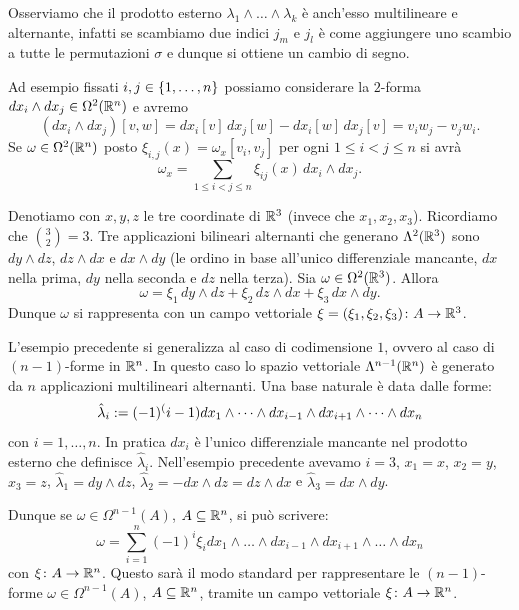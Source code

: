 Osserviamo che il prodotto esterno $\lambda_1 \wedge \dots \wedge \lambda_k$ è anch'esso multilineare e alternante, 
infatti se scambiamo due indici $j_m$ e $j_l$ è come aggiungere uno scambio 
a tutte le permutazioni $\sigma$ e dunque si ottiene un cambio di segno.

\begin{example}
Ad esempio fissati $i,j\in {\left\{ 1,\dots, n \right\}}$
possiamo considerare la $2$-forma 
$dx_i \wedge dx_j\in \Omega^2({\mathbb R}^n)$ e avremo
\[
    (dx_i\wedge dx_j) [v,w] = dx_i[v]\, dx_j[w] - dx_i[w]\, dx_j[v]
      = v_i w_j - v_j w_i. 
\]
Se $\omega \in \Omega^2({\mathbb R}^n)$ 
posto $\xi_{i,j}(x) = \omega_x[v_i,v_j]$ per ogni $1\le i<j\le n$
si avrà 
\[
  \omega_x = \sum_{1\le i < j \le n} \xi_{ij}(x)\, dx_i\wedge dx_j.
\] 
\end{example}

\begin{example}[$2$-forme in $\RR^3$]
Denotiamo con $x,y,z$ le tre coordinate di $\RR^3$ (invece che $x_1,x_2,x_3$).
Ricordiamo che $\binom{3}{2} = 3$.
Tre applicazioni bilineari alternanti che generano 
$\Lambda^2({\mathbb R}^3)$ sono $dy\wedge dz$, $dz\wedge dx$ e $dx \wedge dy$
(le ordino in base all'unico differenziale mancante, $dx$ nella prima, 
$dy$ nella seconda e $dz$ nella terza).
Sia $\omega \in \Omega^2({\mathbb R}^3)$. 
Allora 
\[
  \omega = \xi_1\, dy\wedge dz + \xi_2\, dz\wedge dx + \xi_3\, dx \wedge dy.
\]
Dunque $\omega$ si rappresenta con un campo 
vettoriale $\xi = (\xi_1,\xi_2,\xi_3)\colon A\to {\mathbb R}^3$. 
\end{example}

\begin{example}[$(n-1)$-forme in $\RR^n$]
L'esempio precedente si generalizza al caso di codimensione $1$, 
ovvero al caso di $(n-1)$-forme in $\RR^n$.
In questo caso lo spazio vettoriale $\Lambda^{n-1}({\mathbb R}^n)$ è generato da $n$ applicazioni multilineari alternanti.
Una base naturale è data dalle forme:
\[
  \hat\lambda_i := (-1)^(i-1) dx_{1} \wedge \dots \wedge dx_{i-1} \wedge dx_{i+1} \wedge \dots \wedge dx_n
\]
con $i=1,\dots, n$.
In pratica $dx_i$ è l'unico differenziale mancante nel prodotto esterno
che definisce $\hat\lambda_i$.
Nell'esempio precedente avevamo $i=3$, $x_1=x$, $x_2=y$, $x_3=z$,
$\hat\lambda_1 = dy\wedge dz$, 
$\hat\lambda_2 = -dx\wedge dz = dz\wedge dx$ 
e $\hat\lambda_3 = dx \wedge dy$.

Dunque se $\omega \in \Omega^{n-1}(A)$, $A\subseteq {\mathbb R}^n$, si può scrivere:
\[
 \omega = \sum_{i=1}^n (-1)^i \xi_i dx_1 \wedge \dots \wedge dx_{i-1} \wedge dx_{i+1} \wedge \dots \wedge dx_{n}
\]
con $\xi\colon A \to {\mathbb R}^n$.
Questo sarà il modo standard per rappresentare le $(n-1)$-forme $\omega\in \Omega^{n-1}(A)$,
$A\subseteq {\mathbb R}^n$,
tramite un campo vettoriale $\xi\colon A\to {\mathbb R}^n$. 
\end{example}

